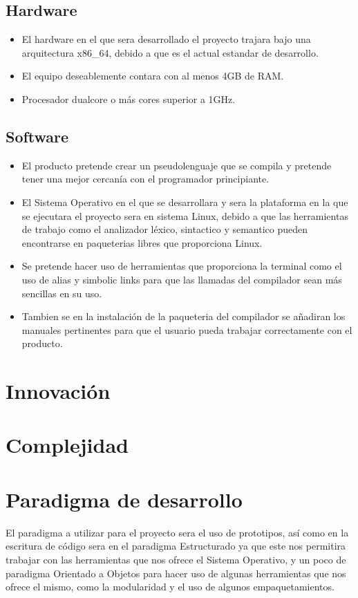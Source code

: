 \documentclass[10pt,executivepaper]{article}
\begin{document}
\subsection{Hardware}
\begin{itemize}
  \item El hardware en el que sera desarrollado el proyecto trajara bajo una arquitectura x86\_64, debido a que es el actual estandar de desarrollo.
  \item El equipo deseablemente contara con al menos 4GB de RAM.
  \item Procesador dualcore o más cores superior a 1GHz.
\end{itemize}
\subsection{Software}
\begin{itemize}
  \item El producto pretende crear un pseudolenguaje que se compila y pretende tener una mejor cercanía con el programador principiante.
  \item El Sistema Operativo en el que se desarrollara y sera la plataforma en la que se ejecutara el proyecto sera en sistema Linux, debido a que las herramientas de trabajo como el analizador léxico, sintactico y semantico pueden encontrarse en paqueterias libres que proporciona Linux.
  \item Se pretende hacer uso de herramientas que proporciona la terminal como el uso de alias y simbolic links para que las llamadas del compilador sean más sencillas en su uso.
  \item Tambien se en la instalación de la paqueteria del compilador se añadiran los manuales pertinentes para que el usuario pueda trabajar correctamente con el producto.
\end{itemize}

\section{Innovación}

\section{Complejidad}

\section{Paradigma de desarrollo}
El paradigma a utilizar para el proyecto sera el uso de prototipos, así como en la escritura de código sera en el paradigma Estructurado ya que este nos permitira trabajar con las herramientas que nos ofrece el Sistema Operativo, y un poco de paradigma Orientado a Objetos para hacer uso de algunas herramientas que nos ofrece el mismo, como la modularidad y el uso de algunos empaquetamientos.
\end{document}
